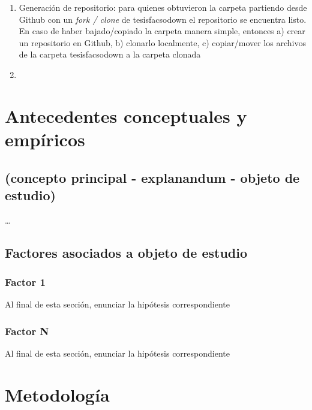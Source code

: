 \documentclass[12pt,twoside]{templates/facsothesis}
\begin{document}
\begin{enumerate}
\def\labelenumi{\arabic{enumi}.}
\item
  Generación de repositorio: para quienes obtuvieron la carpeta partiendo desde Github con un \emph{fork / clone} de tesisfacsodown el repositorio se encuentra listo. En caso de haber bajado/copiado la carpeta manera simple, entonces a) crear un repositorio en Github, b) clonarlo localmente, c) copiar/mover los archivos de la carpeta tesisfacsodown a la carpeta clonada
\item
\end{enumerate}

\hypertarget{antecedentes-conceptuales-y-empuxedricos}{%
\chapter{Antecedentes conceptuales y empíricos}\label{antecedentes-conceptuales-y-empuxedricos}}

\hypertarget{concepto-principal---explanandum---objeto-de-estudio}{%
\section{(concepto principal - explanandum - objeto de estudio)}\label{concepto-principal---explanandum---objeto-de-estudio}}

\ldots{}

\hypertarget{factores-asociados-a-objeto-de-estudio}{%
\section{Factores asociados a objeto de estudio}\label{factores-asociados-a-objeto-de-estudio}}

\hypertarget{factor-1}{%
\subsection{Factor 1}\label{factor-1}}

Al final de esta sección, enunciar la hipótesis correspondiente

\hypertarget{factor-n}{%
\subsection{Factor N}\label{factor-n}}

Al final de esta sección, enunciar la hipótesis correspondiente

\hypertarget{metodologuxeda}{%
\chapter{Metodología}\label{metodologuxeda}}
\end{document}
